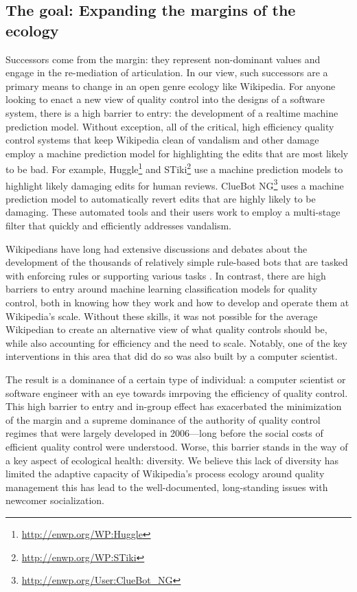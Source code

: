 \subsection{The goal: Expanding the margins of the ecology}
Successors come from the margin: they represent non-dominant values and engage in the re-mediation of articulation\cite{mugar2017preserving}.  In our view, such successors are a primary means to change in an open genre ecology like Wikipedia.  For anyone looking to enact a new view of quality control into the designs of a software system, there is a high barrier to entry: the development of a realtime machine prediction model.  Without exception, all of the critical, high efficiency quality control systems that keep Wikipedia clean of vandalism and other damage employ a machine prediction model for highlighting the edits that are most likely to be bad. For example, Huggle\footnote{\url{http://enwp.org/WP:Huggle}} and STiki\footnote{\url{http://enwp.org/WP:STiki}} use a machine prediction models to highlight likely damaging edits for human reviews.  ClueBot NG\footnote{\url{http://enwp.org/User:ClueBot_NG}} uses a machine prediction model to automatically revert edits that are highly likely to be damaging.  These automated tools and their users work to employ a multi-stage filter that quickly and efficiently addresses vandalism\cite{geiger2013levee}.

Wikipedians have long had extensive discussions and debates about the development of the thousands of relatively simple rule-based bots that are tasked with enforcing rules or supporting various tasks \cite{geiger2011lives}. In contrast, there are high barriers to entry around machine learning classification models for quality control, both in knowing how they work and how to develop and operate them at Wikipedia's scale.  Without these skills, it was not possible for the average Wikipedian to create an alternative view of what quality controls should be, while also accounting for efficiency and the need to scale.  Notably, one of the key interventions in this area that did do so was also built by a computer scientist\cite{halfaker2014snuggle}.

The result is a dominance of a certain type of individual: a computer scientist or software engineer with an eye towards imrpoving the efficiency of quality control.  This high barrier to entry and in-group effect has exacerbated the minimization of the margin and a supreme dominance of the authority of quality control regimes that were largely developed in 2006---long before the social costs of efficient quality control were understood\cite{halfaker2014snuggle}.  Worse, this barrier stands in the way of a key aspect of ecological health: diversity.  We believe this lack of diversity has limited the adaptive capacity of Wikipedia's process ecology around quality management this has lead to the well-documented, long-standing issues with newcomer socialization\cite{halfaker2013rise}.

